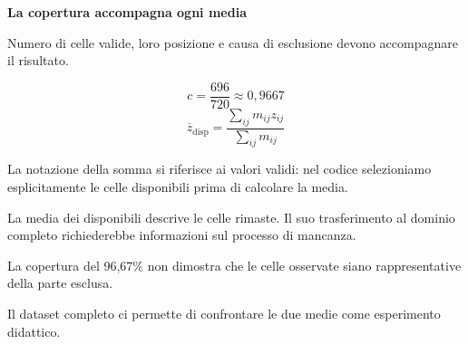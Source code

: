 \documentclass[12pt,aspectratio=1610]{beamer}
\newcommand{\PBody}[1]{\par{\fontsize{11.3}{14.8}\selectfont #1\par}}
\newcommand{\PSmall}[1]{\par{\fontsize{9.8}{13.1}\selectfont #1\par}}
\newcommand{\PInfo}[1]{%
\begin{tcolorbox}[enhanced,arc=1.6mm,boxrule=.55pt,colback=GeoTint,
 colframe=Rule!80!Classical,left=2.3mm,right=2.3mm,top=2mm,bottom=2mm,
 before skip=1mm,after skip=1mm]
\PSmall{#1}\end{tcolorbox}}
\begin{document}
\begin{frame}[plain]\hypertarget{slide23}{}
\begin{lrbox}{\TitleBox}
\begin{minipage}[t]{17.7cm}\raggedright\color{Ink}\fontsize{11.3}{14.8}\selectfont
\color{Navy}\bfseries\fontsize{20.6}{24.5}\selectfont La copertura accompagna ogni media
\end{minipage}\end{lrbox}

\begin{lrbox}{\RecallBox}
\begin{minipage}[t]{14.3cm}\raggedright\color{Ink}\fontsize{11.3}{14.8}\selectfont
\fontsize{10.3}{13.8}\selectfont Numero di celle valide, loro posizione e causa di esclusione devono accompagnare il risultato.
\end{minipage}\end{lrbox}

\begin{lrbox}{\PilotLeftBox}
\begin{minipage}[t]{10.05cm}\raggedright\color{Ink}\fontsize{11.3}{14.8}\selectfont
\[c=\frac{696}{720}\approx0{,}9667\]
\[\overline z_{\mathrm{disp}}=\frac{\sum_{ij}m_{ij}z_{ij}}{\sum_{ij}m_{ij}}\]
\PInfo{La notazione della somma si riferisce ai valori validi: nel codice selezioniamo esplicitamente le celle disponibili prima di calcolare la media.}

\end{minipage}\end{lrbox}

\begin{lrbox}{\PilotRightBox}
\begin{minipage}[t]{7.55cm}\raggedright\color{Ink}\fontsize{11.3}{14.8}\selectfont
\PBody{La media dei disponibili descrive le celle rimaste. Il suo trasferimento al dominio completo richiederebbe informazioni sul processo di mancanza.}
\vspace{2.5mm}
\PBody{La copertura del 96,67\% non dimostra che le celle osservate siano rappresentative della parte esclusa.}
\vspace{2.5mm}
\PSmall{Il dataset completo ci permette di confrontare le due medie come esperimento didattico.}


\end{minipage}
\end{lrbox}
\end{frame}
\end{document}
